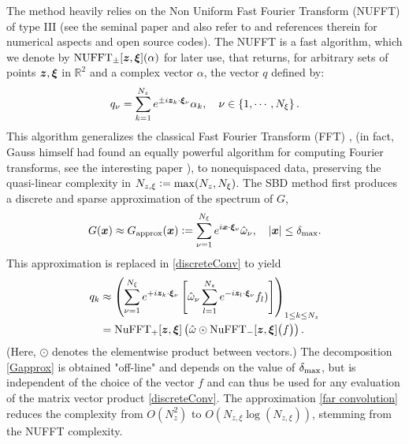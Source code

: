 \documentclass[11pt,a4paper]{article}
\begin{document}
The method heavily relies on the Non Uniform Fast Fourier Transform (NUFFT) of type III (see the seminal paper \cite{NuFFT} and also refer to \cite{greengard2004accelerating,poplau2006calculation} and references therein for numerical aspects and open source codes).  The NUFFT is a fast algorithm, which we denote by $\operatorname{NUFFT}_\pm[\boldsymbol{z},\boldsymbol{\xi}](\alpha)$ for later use, that returns, for arbitrary sets of points $\boldsymbol{z},\boldsymbol{\xi}$ in $\mathbb{R}^2$ and a complex vector $\alpha$, the vector $q$ defined by:
\[ q_\nu = \sum_{k = 1}^{N_z} e^{\pm i \boldsymbol{z}_k \cdot \boldsymbol{\xi}_\nu} \alpha_k, \quad \nu \in \left\{1,\cdots,N_\xi \right\}.\]
This algorithm generalizes the classical Fast Fourier Transform (FFT) \cite{cooley1965algorithm}, (in fact, Gauss himself had found an equally powerful algorithm for computing Fourier transforms, see the interesting paper \cite{gaussFFT}), to nonequispaced data, preserving the quasi-linear complexity in $N_{z,\xi} \mathrel{\mathop:}= \max(N_z,N_\xi)$.
The SBD method first produces a discrete and sparse approximation of the spectrum of $G$,
\begin{equation}
	\label{Gapprox}
	G(\boldsymbol{x}) \approx G_{\text{approx}}(\boldsymbol{x}) \mathrel{\mathop:}= \sum_{\nu=1}^{N_\xi} e^{i  \boldsymbol{x}\cdot \boldsymbol{\xi}_\nu} \hat{\omega}_\nu, \quad \left\lvert \boldsymbol{x} \right\rvert \leq \delta_{\max}.
\end{equation}
This approximation is replaced in \eqref{discreteConv} to yield 
\begin{equation}
	\begin{split}	q_{k} &\approx \left(\sum_{\nu = 1}^{N_\xi} e^{+i  \boldsymbol{z}_k  \cdot\boldsymbol{\xi}_\nu } \left[\hat{\omega}_\nu \sum_{l=1}^{N_z} e^{- i \boldsymbol{z}_l \cdot \boldsymbol{\xi}_\nu} f_l) \right]\right)_{1 \leq k \leq N_z}\\
		&= \operatorname{NuFFT}_+[\boldsymbol{z},\boldsymbol{\xi}]\left(\hat{\omega} \odot \operatorname{NuFFT}_-[\boldsymbol{z},\boldsymbol{\xi}]\big(f\big)\right).
	\end{split}
	\label{far convolution}					
\end{equation}
(Here, $\odot$ denotes the elementwise product between vectors.) The decomposition \eqref{Gapprox} is obtained "off-line" and depends on the value of $\delta_{\max}$, but is independent of the choice of the vector $f$ and can thus be used for any evaluation of the matrix vector product \eqref{discreteConv}. 
The approximation \eqref{far convolution} reduces the complexity from $O(N_z^2)$ to $O(N_{z,\xi}\log (N_{z,\xi}))$, stemming from the NUFFT complexity.
\end{document}
